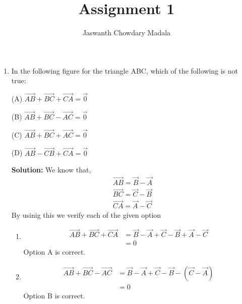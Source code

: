 \documentclass[journal,12pt,twocolumn]{IEEEtran}
\begin{document}
\vspace{3cm}


\title{Assignment 1}
\author{Jaswanth Chowdary Madala}





\maketitle

\newpage


\bigskip

\renewcommand{\thefigure}{\theenumi}
\renewcommand{\thetable}{\theenumi}

\begin{enumerate}
\item In the following figure for the triangle ABC, which of the following is not true:

(A) $\overrightarrow{AB}+\overrightarrow{BC}+\overrightarrow{CA} = \overrightarrow{0}$

(B) $\overrightarrow{AB}+\overrightarrow{BC}-\overrightarrow{AC} = \overrightarrow{0}$

(C) $\overrightarrow{AB}+\overrightarrow{BC}+\overrightarrow{AC} = \overrightarrow{0}$

(D) $\overrightarrow{AB}-\overrightarrow{CB}+\overrightarrow{CA} = \overrightarrow{0}$

\textbf{Solution:}
\fi
		We know that,
\begin{align}
\overrightarrow{AB} = \vec{B} - \vec{A}\\
\overrightarrow{BC} = \vec{C} - \vec{B}\\
\overrightarrow{CA} = \vec{A} - \vec{C}
\end{align}
By usinig this we verify each of the given option

\begin{enumerate}
\item 
\begin{align}
\overrightarrow{AB}+\overrightarrow{BC}+\overrightarrow{CA} &=
\vec{B}-\vec{A} + \vec{C} - \vec{B} + \vec{A} - \vec{C}\\
 &= 0
\end{align}
Option A is correct.

\item
\begin{align}
\overrightarrow{AB}+\overrightarrow{BC}-\overrightarrow{AC} &=
\vec{B}-\vec{A} + \vec{C} - \vec{B} - (\vec{C} - \vec{A})\\
 &= 0
\end{align}
Option B is correct.


\end{enumerate}
\end{enumerate}
\end{document}
